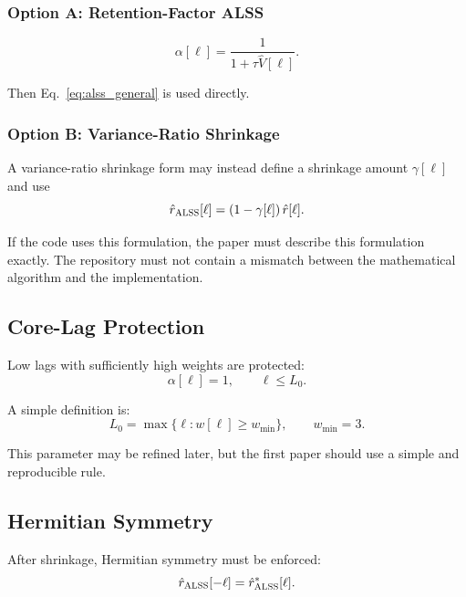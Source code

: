 \documentclass[11pt,letterpaper]{article}
\newcommand{\ALSS}{\textsc{ALSS}}
\begin{document}
\subsubsection{Option A: Retention-Factor ALSS}

\begin{equation}
    \alpha[\ell] = \frac{1}{1+\tau \hat{V}[\ell]} .
\end{equation}

Then Eq.~\eqref{eq:alss_general} is used directly.

\subsubsection{Option B: Variance-Ratio Shrinkage}

A variance-ratio shrinkage form may instead define a shrinkage amount $\gamma[\ell]$ and use
\begin{equation}
    \hat{r}_{\ALSS}[\ell] = \left(1-\gamma[\ell]\right)\hat{r}[\ell] .
\end{equation}

If the code uses this formulation, the paper must describe this formulation exactly. The repository must not contain a mismatch between the mathematical algorithm and the implementation.

\subsection{Core-Lag Protection}

Low lags with sufficiently high weights are protected:
\begin{equation}
    \alpha[\ell]=1, \qquad \ell \leq L_0 .
\end{equation}

A simple definition is:
\begin{equation}
    L_0 = \max\{\ell : w[\ell]\geq w_{\min}\}, \qquad w_{\min}=3 .
\end{equation}

This parameter may be refined later, but the first paper should use a simple and reproducible rule.

\subsection{Hermitian Symmetry}

After shrinkage, Hermitian symmetry must be enforced:
\begin{equation}
    \hat{r}_{\ALSS}[-\ell] = \hat{r}_{\ALSS}^{*}[\ell] .
\end{equation}
\end{document}
